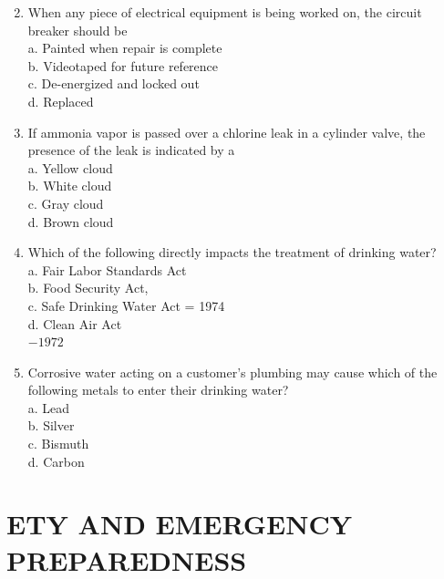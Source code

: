 \documentclass[10pt]{article}
\begin{document}
\begin{enumerate}
  \setcounter{enumi}{1}
  \item When any piece of electrical equipment is being worked on, the circuit breaker should be\\
a. Painted when repair is complete\\
b. Videotaped for future reference\\
c. De-energized and locked out\\
d. Replaced

  \item If ammonia vapor is passed over a chlorine leak in a cylinder valve, the presence of the leak is indicated by a\\
a. Yellow cloud\\
b. White cloud\\
c. Gray cloud\\
d. Brown cloud

  \item Which of the following directly impacts the treatment of drinking water?\\
a. Fair Labor Standards Act\\
b. Food Security Act,\\
c. Safe Drinking Water Act = 1974\\
d. Clean Air Act\\
$-1972$

  \item Corrosive water acting on a customer's plumbing may cause which of the following metals to enter their drinking water?\\
a. Lead\\
b. Silver\\
c. Bismuth\\
d. Carbon

\end{enumerate}

\section{ETY AND EMERGENCY PREPAREDNESS}
\end{document}
